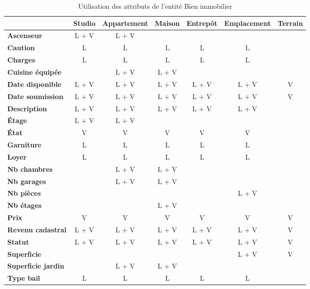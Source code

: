 \begin{table}
  \centering
  \begin{tabular}{|l|c|c|c|c|c|c|}
  \hline
  \rowcolor{gray05} \multicolumn{1}{|c|}{\textbf{Attribut}} & \multicolumn{1}{|c|}{\textbf{Studio}} & \multicolumn{1}{|c|}{\textbf{Appartement}} & \multicolumn{1}{|c|}{\textbf{Maison}} & \multicolumn{1}{|c|}{\textbf{Entrepôt}} & \multicolumn{1}{|c|}{\textbf{Emplacement}} & \multicolumn{1}{|c|}{\textbf{Terrain}} \\
  \hline
  \hline
  \textbf{Ascenseur} & L + V & L + V &  &  &  &  \\
  \hline
  \textbf{Caution} & L & L & L & L & L &  \\
  \hline
  \textbf{Charges} & L & L & L & L & L &  \\
  \hline
  \textbf{Cuisine équipée} &  & L + V & L + V &  &  &  \\
  \hline
  \textbf{Date disponible} & L + V & L + V & L + V & L + V & L + V & V \\
  \hline
  \textbf{Date soumission} & L + V & L + V & L + V & L + V & L + V & V \\
  \hline
  \textbf{Description} & L + V & L + V & L + V & L + V & L + V &  \\
  \hline
  \textbf{Étage} & L + V & L + V &  &  &  &  \\
  \hline
  \textbf{État} & V & V & V & V & V &  \\
  \hline
  \textbf{Garniture} & L & L & L & L & L &  \\
  \hline
  \textbf{Loyer} & L & L & L & L & L &  \\
  \hline
  \textbf{Nb chambres} &  & L + V & L + V &  &  &  \\
  \hline
  \textbf{Nb garages} &  & L + V & L + V &  &  &  \\
  \hline
  \textbf{Nb pièces} &  &  &  &  & L + V &  \\
 \hline
  \textbf{Nb étages} &  &  & L + V &  &  &  \\
  \hline
  \textbf{Prix} & V & V & V & V & V & V \\
  \hline
  \textbf{Revenu cadastral} & L + V & L + V & L + V & L + V & L + V & V \\
  \hline
  \textbf{Statut} & L + V & L + V & L + V & L + V & L + V & V \\
  \hline
  \textbf{Superficie} &  &  &  &  & L + V  & V \\
  \hline
  \textbf{Superficie jardin} &  & L + V & L + V &  &  &  \\
  \hline
  \textbf{Type bail} & L & L & L & L & L &  \\
  \hline
  \end{tabular}
  \caption{Utilisation des attributs de l'entité \og{}Bien immobilier\fg{}}
  \label{tbl_usage_attribut_bien_immobilier}
\end{table}

